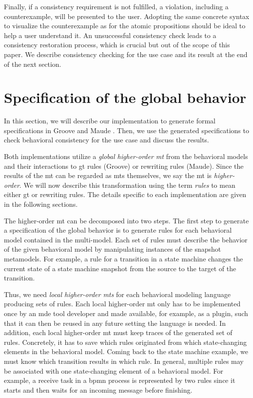 \documentclass{jot}
\begin{document}
Finally, if a consistency requirement is not fulfilled, a violation, including a counterexample, will be presented to the user.
Adopting the same concrete syntax to visualize the counterexample as for the atomic propositions should be ideal to help a user understand it. 
An unsuccessful consistency check leads to a consistency restoration process, which is crucial but out of the scope of this paper.
We describe consistency checking for the use case and its result at the end of the next section.


\section{Specification of the global behavior} \label{sec:specification_of_the_global_behavior}
In this section, we will describe our implementation to generate formal specifications in Groove \cite{rensinkGROOVESimulatorTool2004} and Maude \cite{clavelAllMaudeHighPerformance2007}.
Then, we use the generated specifications to check behavioral consistency for the use case and discuss the results.

Both implementations utilize a \emph{global higher-order \gls*{mt}} from the behavioral models and their interactions to \gls*{gt} rules (Groove) or rewriting rules (Maude).
Since the results of the \gls*{mt} can be regarded as \gls*{mt}s themselves, we say the \gls*{mt} is \textit{higher-order}.
We will now describe this transformation using the term \emph{rules} to mean either \gls*{gt} or rewriting rules.
The details specific to each implementation are given in the following sections.

The higher-order \gls*{mt} can be decomposed into two steps.
The first step to generate a specification of the global behavior is to generate rules for each behavioral model contained in the multi-model.
Each set of rules must describe the behavior of the given behavioral model by manipulating instances of the snapshot metamodels.
For example, a rule for a transition in a state machine changes the current state of a state machine snapshot from the source to the target of the transition. 

Thus, we need \emph{local higher-order \gls*{mt}s} for each behavioral modeling language producing sets of rules.
Each local higher-order \gls*{mt} only has to be implemented once by an \gls*{mde} tool developer and made available, for example, as a plugin, such that it can then be reused in any future setting the language is needed.
In addition, each local higher-order \gls*{mt} must keep traces of the generated set of rules.
Concretely, it has to save which rules originated from which state-changing elements in the behavioral model.
Coming back to the state machine example, we must know which transition results in which rule.
In general, multiple rules may be associated with one state-changing element of a behavioral model.
For example, a receive task in a \gls*{bpmn} process is represented by two rules since it starts and then waits for an incoming message before finishing.
\end{document}
